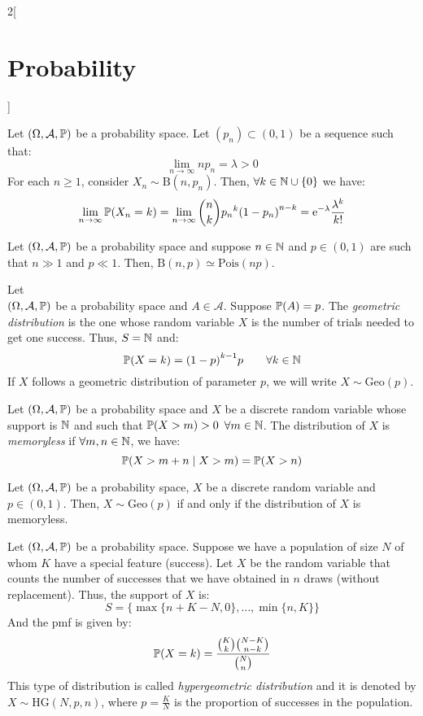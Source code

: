 \documentclass[../../../main.tex]{subfiles}
\begin{document}
\begin{multicols}{2}[\section{Probability}]
\begin{definition}
    \end{definition}
    \begin{theorem}
        Let $(\Omega,\mathcal{A},\mathbb{P})$ be a probability space. Let $(p_n)\subset(0,1)$ be a sequence such that: $$\lim_{n\to\infty}np_n=\lambda>0$$
        For each $n\geq 1$, consider $X_n\sim \text{B}(n,p_n)$. Then, $\forall k\in\mathbb{N}\cup\{0\}$ we have: $$\lim_{n\to\infty}\mathbb{P}(X_n=k)=\lim_{n\to\infty}\binom{n}{k}{p_n}^k{(1-p_n)}^{n-k}=\mathrm{e}^{-\lambda}\frac{\lambda^k}{k!}$$
    \end{theorem}
    \begin{corollary}
        Let $(\Omega,\mathcal{A},\mathbb{P})$ be a probability space and suppose $n\in\mathbb{N}$ and $p\in (0,1)$ are such that $n\gg 1$ and $p\ll 1$. Then, $\text{B}(n,p)\simeq\text{Pois}(np)$.
    \end{corollary}
    \begin{definition}
        Let\\ $(\Omega,\mathcal{A},\mathbb{P})$ be a probability space and $A\in\mathcal{A}$. Suppose $\mathbb{P}(A)=p$. The \textit{geometric distribution} is the one whose random variable $X$ is the number of trials needed to get one success. Thus, $S=\mathbb{N}$ and: $$\mathbb{P}(X=k)={(1-p)}^{k-1}p\qquad \forall k\in\mathbb{N}$$ If $X$ follows a geometric distribution of parameter $p$, we will write $X\sim \text{Geo}(p)$.
    \end{definition}
    \begin{definition}
        Let $(\Omega,\mathcal{A},\mathbb{P})$ be a probability space and $X$ be a discrete random variable whose support is $\mathbb{N}$ and such that $\mathbb{P}(X >m)>0$ $\forall m\in\mathbb{N}$. The distribution of $X$ is \textit{memoryless} if $\forall m,n\in\mathbb{N}$, we have: $$\mathbb{P}(X>m+n\mid X >m)=\mathbb{P}(X>n)$$
    \end{definition}
    \begin{prop}
        Let $(\Omega,\mathcal{A},\mathbb{P})$ be a probability space, $X$ be a discrete random variable and $p\in(0,1)$. Then, $X\sim\text{Geo}(p)$ if and only if the distribution of $X$ is memoryless.
    \end{prop}
    \begin{definition}
        Let $(\Omega,\mathcal{A},\mathbb{P})$ be a probability space. Suppose we have a population of size $N$ of whom $K$ have a special feature (success). Let $X$ be the random variable that counts the number of successes that we have obtained in $n$ draws (without replacement). Thus, the support of $X$ is: $$S=\{\max\{n+K-N,0\},\ldots,\min\{n,K\}\}$$ And the pmf is given by: $$\mathbb{P}(X=k)=\frac{\binom{K}{k}\binom{N-K}{n-k}}{\binom{N}{n}}$$ This type of distribution is called \textit{hypergeometric distribution} and it is denoted by $X\sim \text{HG}(N,p,n)$, where $p=\frac{K}{N}$ is the proportion of successes in the population.

\end{definition}
\end{multicols}
\end{document}

